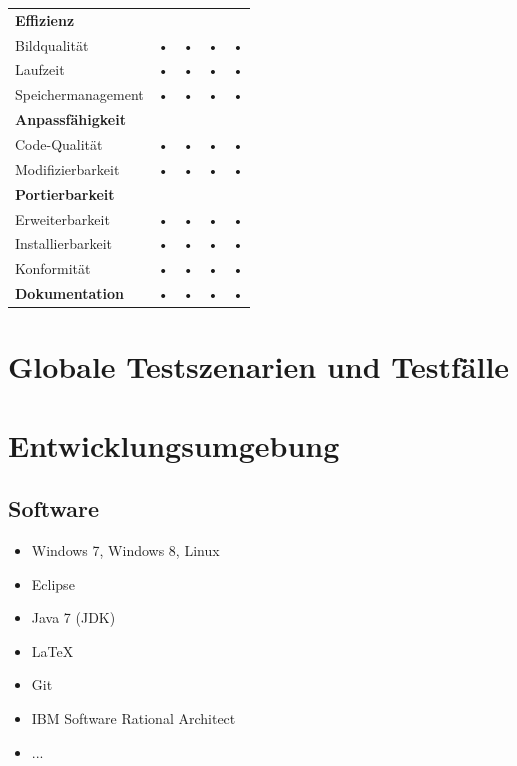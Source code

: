 \documentclass[10pt]{report}
\begin{document}
\begin{center}
\begin{tabular}{lcccc}
\hline 
\rule[-1ex]{0pt}{4ex} \textbf{Effizienz} &  &  &  &  \\ 
\rule[-1ex]{0pt}{4ex} \hspace{10pt} Bildqualität & • & • & • & • \\ 
\rule[-1ex]{0pt}{4ex} \hspace{10pt} Laufzeit & • & • & • & • \\ 
\rule[-1ex]{0pt}{4ex} \hspace{10pt} Speichermanagement & • & • & • & • \\ 

\hline 
\rule[-1ex]{0pt}{4ex} \textbf{Anpassfähigkeit} &  &  &  &  \\ 
\rule[-1ex]{0pt}{4ex} \hspace{10pt} Code-Qualität & • & • & • & • \\ 
\rule[-1ex]{0pt}{4ex} \hspace{10pt} Modifizierbarkeit & • & • & • & • \\ 

\hline 
\rule[-1ex]{0pt}{4ex} \textbf{Portierbarkeit} &  &  &  &  \\ 
\rule[-1ex]{0pt}{4ex} \hspace{10pt} Erweiterbarkeit & • & • & • & • \\ 
\rule[-1ex]{0pt}{4ex} \hspace{10pt} Installierbarkeit & • & • & • & • \\ 
\rule[-1ex]{0pt}{4ex} \hspace{10pt} Konformität & • & • & • & • \\ 

\hline 
\rule[-1ex]{0pt}{4ex} \textbf{Dokumentation} & • & • & • & • \\ 
\hline 
\end{tabular} 
\end{center}


\chapter{Globale Testszenarien und Testfälle}

\chapter{Entwicklungsumgebung}
\section{Software}
\begin{itemize}
\item Windows 7, Windows 8, Linux
\item Eclipse
\item Java 7 (JDK)
\item \LaTeX
\item Git
\item IBM Software Rational Architect
\item ...
\end{itemize}
\end{document}
